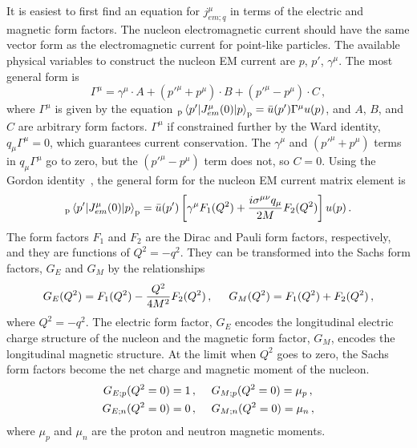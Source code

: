   It is easiest to first find an equation for $j^{\mu}_{em;q}$ in terms of the
  electric and magnetic form factors. The nucleon electromagnetic current
  should have the same vector form as the electromagnetic current for
  point-like particles. The available physical variables to construct the
  nucleon EM current are $p$, $p'$, $\gamma^{\mu}$. The most general form is
  \begin{equation}
    \Gamma^{\mu} = \gamma^{\mu}\cdot A + (p'^{\mu} + p^{\mu})\cdot B + (p'^{\mu} - p^{\mu})\cdot C \,,
  \end{equation}
  where $\Gamma^{\mu}$ is given by the equation
  $_{\textrm{p}}\mel{p'}{J^{\mu}_{em}(0)}{p}_{\textrm{p}} =
  \bar{u}(p')\Gamma^{\mu}u(p)$, and $A$, $B$, and $C$ are arbitrary form
  factors.  $\Gamma^{\mu}$ if constrained further by the Ward identity,
  $q_{\mu}\Gamma^{\mu} = 0$, which guarantees current conservation. The
  $\gamma^{\mu}$ and $(p'^{\mu} + p^{\mu})$ terms in $q_{\mu}\Gamma^{\mu}$ go
  to zero, but the $(p'^{\mu} - p^{\mu})$ term does not, so $C=0$. Using the
  Gordon identity~\cite{Gordon}, the general form for the nucleon EM current
  matrix element is
  \begin{equation}\label{eq:FFem}
    _{\textrm{p}}\mel{p'}{J^{\mu}_{em}(0)}{p}_{\textrm{p}} =
      \bar{u}(p')\left[ \gamma^{\mu}F_1(Q^2) + \frac{i\sigma^{\mu\nu}q_{\mu}}{2M}F_2(Q^2)  \right]u(p) \,.
  \end{equation}
  The form factors $F_1$ and $F_2$ are the Dirac and Pauli form factors,
  respectively, and they are functions of $Q^2 = -q^2$. They can be transformed
  into the Sachs form factors, $G_E$ and $G_M$ by the relationships
  \begin{equation}
    G_E(Q^2) = F_1(Q^2) - \frac{Q^2}{4M^2}F_2(Q^2)\,, \hspace{5mm} G_M(Q^2) = F_1(Q^2) + F_2(Q^2) \,,
  \end{equation}
  where $Q^2 = -q^2$.  The electric form factor, $G_E$ encodes the longitudinal
  electric charge structure of the nucleon and the magnetic form factor, $G_M$,
  encodes the longitudinal magnetic structure. At the limit when $Q^2$ goes to
  zero, the Sachs form factors become the net charge and magnetic moment of the
  nucleon.
  \begin{equation}
    \begin{aligned}
      G_{E;p}(Q^2=0) = 1 \,,& \hspace{5mm} G_{M;p}(Q^2=0) = \mu_p \,, \\
      G_{E;n}(Q^2=0) = 0 \,,& \hspace{5mm} G_{M;n}(Q^2=0) = \mu_n \,,
    \end{aligned}
  \end{equation}
  where $\mu_p$ and $\mu_n$ are the proton and neutron magnetic moments.
 

